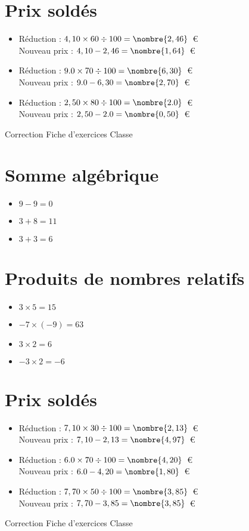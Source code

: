 \documentclass[a4paper,11pt,fleqn]{article}
\begin{document}
\section{Prix soldés}
\begin{itemize}

  \item Réduction : $4,10\times60\div100=\nombre{2,46}$~€\\
  Nouveau prix : $4,10-2,46=\nombre{1,64}$~€
  \item Réduction : $9.0\times70\div100=\nombre{6,30}$~€\\
  Nouveau prix : $9.0-6,30=\nombre{2,70}$~€
  \item Réduction : $2,50\times80\div100=\nombre{2.0}$~€\\
  Nouveau prix : $2,50-2.0=\nombre{0,50}$~€
\end{itemize}
\newpage
\setcounter{exo}{0}
\setcounter{section}{0}
{Correction} \hfill {\huge Fiche d'exercices } \hfill {Classe}

\section{Somme algébrique}
\begin{itemize}

  \item $9 -9=0$
  \item $3 +8=11$
  \item $3 +3=6$
\end{itemize}

\section{Produits de nombres relatifs}
\begin{itemize}

  \item $3\times5=15$
  \item $-7\times(-9)=63$
  \item $3\times2=6$
  \item $-3\times2=-6$
\end{itemize}

\section{Prix soldés}
\begin{itemize}

  \item Réduction : $7,10\times30\div100=\nombre{2,13}$~€\\
  Nouveau prix : $7,10-2,13=\nombre{4,97}$~€
  \item Réduction : $6.0\times70\div100=\nombre{4,20}$~€\\
  Nouveau prix : $6.0-4,20=\nombre{1,80}$~€
  \item Réduction : $7,70\times50\div100=\nombre{3,85}$~€\\
  Nouveau prix : $7,70-3,85=\nombre{3,85}$~€
\end{itemize}
\newpage
\setcounter{exo}{0}
\setcounter{section}{0}
{Correction} \hfill {\huge Fiche d'exercices } \hfill {Classe}
\end{document}

